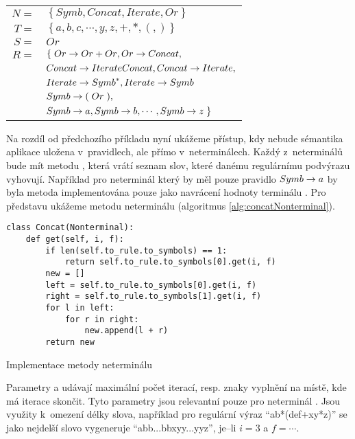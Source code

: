 		\begin{tabular}{rl}
			$N=$ & $\left\{ Symb, Concat, Iterate, Or\right\}$\\
			$T=$ & $\left\{ a,b,c,\cdots,y,z,+,*,\left(\right.,\left.\right) \right\}$\\
			$S=$ & $Or$\\
			$R=$ & $\left\{\right.  {Or} \allowbreak\rightarrow\allowbreak {Or + Or}, {Or} \allowbreak\rightarrow\allowbreak {Concat}, $ \\
			& ${Concat} \allowbreak\rightarrow\allowbreak {Iterate Concat}, {Concat} \allowbreak\rightarrow\allowbreak {Iterate},$ \\
			& ${Iterate} \allowbreak\rightarrow\allowbreak {{Symb}^{\ast}}, {Iterate} \allowbreak\rightarrow\allowbreak {Symb}$ \\
			& ${Symb} \allowbreak\rightarrow\allowbreak {\left(\right. Or \left.\right)},$ \\
			& ${Symb} \allowbreak\rightarrow\allowbreak {a}, {Symb} \allowbreak\rightarrow\allowbreak {b}, \cdots, {Symb} \allowbreak\rightarrow\allowbreak {z} \left.\right\}$ \\
		\end{tabular}
		
		Na rozdíl od předchozího příkladu nyní ukážeme přístup, kdy nebude sémantika aplikace uložena v~pravidlech, ale přímo v~neterminálech. Každý z~neterminálů bude mít metodu , která vrátí seznam slov, které danému regulárnímu podvýrazu vyhovují. Například pro neterminál  který by měl pouze pravidlo ${Symb} \allowbreak\rightarrow\allowbreak {a}$ by byla metoda implementována pouze jako navrácení hodnoty terminálu .
		Pro představu ukážeme metodu  neterminálu  (algoritmus \ref{alg:concatNonterminal}).
		
		\begin{listing}
			\begin{verbatim}
class Concat(Nonterminal):
	def get(self, i, f):
		if len(self.to_rule.to_symbols) == 1:
			return self.to_rule.to_symbols[0].get(i, f)
		new = []
		left = self.to_rule.to_symbols[0].get(i, f)
		right = self.to_rule.to_symbols[1].get(i, f)
		for l in left:
			for r in right:
				new.append(l + r)
		return new
			\end{verbatim}
			\caption{Implementace metody  neterminálu }
			\label{alg:concatNonterminal}
		\end{listing}
		
		Parametry  a  udávají maximální počet iterací, resp. znaky vyplnění na místě, kde má iterace skončit. Tyto parametry jsou relevantní pouze pro neterminál . Jsou využity k~omezení délky slova, například pro regulární výraz \enquote{ab*(def+xy*z)} se jako nejdelší slovo vygeneruje \enquote{abb...bbxyy...yyz}, je--li $i=3$ a $f=\cdots$.
		
